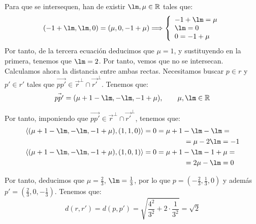 \documentclass[12pt]{article}
\begin{document}
\begin{ejercicio}[2.5 puntos]
\begin{enumerate}
            Para que se intersequen, han de existir $\lm, \mu \in \bb{R}$ tales que:
            \begin{equation*}
                (-1+\lm, \lm, 0) = (\mu, 0, -1+\mu) \Longrightarrow
                \left\{
                    \begin{array}{l}
                        -1+\lm = \mu \\
                        \lm = 0 \\
                        0 = -1+\mu
                    \end{array}
                \right.
            \end{equation*}
            Por tanto, de la tercera ecuación deducimos que $\mu = 1$, y sustituyendo en la primera, tenemos que $\lm = 2$.
            Por tanto, vemos que no se intersecan. Calculamos ahora la distancia entre ambas rectas.
            Necesitamos buscar $p\in r$ y $p'\in r'$ tales que $\vec{pp'}\in \vec{r}^\perp \cap \vec{r'}^\perp$.
            Tenemos que:
            \begin{equation*}
                \vec{pp'} = (\mu+1-\lm, -\lm, -1+\mu),\qquad \mu, \lm \in \bb{R}
            \end{equation*}

            Por tanto, imponiendo que $\vec{pp'}\in \vec{r}^\perp \cap \vec{r'}^\perp$, tenemos que:
            \begin{align*}
                \left\langle (\mu+1-\lm, -\lm, -1+\mu), (1,1,0) \right\rangle &= 0
                = \mu+1-\lm -\lm =\\&\hspace{2cm}= \mu -2\lm =-1 \\
                \left\langle (\mu+1-\lm, -\lm, -1+\mu), (1,0,1) \right\rangle &= 0
                = \mu+1-\lm -1+\mu =\\&\hspace{2cm}= 2\mu -\lm =0
            \end{align*}

            Por tanto, deducimos que $\mu=\frac{2}{3}$, $\lm=\frac{1}{3}$, por lo que $p=\left(-\frac{2}{3}, \frac{1}{3}, 0\right)$ y además $p'=\left(\frac{2}{3}, 0, -\frac{1}{3}\right)$.
            Tenemos que:
            \begin{equation*}
                d(r,r') = d(p, p') = \sqrt{\frac{4^2}{3^2} +2\cdot \frac{1}{3^2}} = \sqrt{2}
            \end{equation*}
        \end{enumerate}
    \end{ejercicio}
\end{document}
